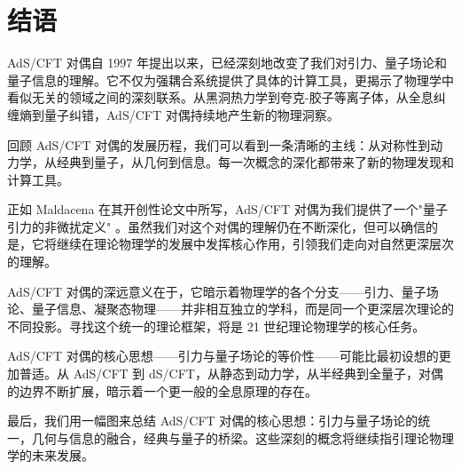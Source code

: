 
\section{结语}

AdS/CFT 对偶自 1997 年提出以来，已经深刻地改变了我们对引力、量子场论和量子信息的理解。它不仅为强耦合系统提供了具体的计算工具，更揭示了物理学中看似无关的领域之间的深刻联系。从黑洞热力学到夸克-胶子等离子体，从全息纠缠熵到量子纠错，AdS/CFT 对偶持续地产生新的物理洞察。

\begin{note}
回顾 AdS/CFT 对偶的发展历程，我们可以看到一条清晰的主线：从对称性到动力学，从经典到量子，从几何到信息。每一次概念的深化都带来了新的物理发现和计算工具。
\end{note}

正如 Maldacena 在其开创性论文中所写，AdS/CFT 对偶为我们提供了一个"量子引力的非微扰定义" \cite{Maldacena1997}。虽然我们对这个对偶的理解仍在不断深化，但可以确信的是，它将继续在理论物理学的发展中发挥核心作用，引领我们走向对自然更深层次的理解。

\begin{remark}
AdS/CFT 对偶的深远意义在于，它暗示着物理学的各个分支——引力、量子场论、量子信息、凝聚态物理——并非相互独立的学科，而是同一个更深层次理论的不同投影。寻找这个统一的理论框架，将是 21 世纪理论物理学的核心任务。
\end{remark}

\begin{property}[对偶的普适性]
AdS/CFT 对偶的核心思想——引力与量子场论的等价性——可能比最初设想的更加普适。从 AdS/CFT 到 dS/CFT，从静态到动力学，从半经典到全量子，对偶的边界不断扩展，暗示着一个更一般的全息原理的存在。
\end{property}

最后，我们用一幅图来总结 AdS/CFT 对偶的核心思想：引力与量子场论的统一，几何与信息的融合，经典与量子的桥梁。这些深刻的概念将继续指引理论物理学的未来发展。
